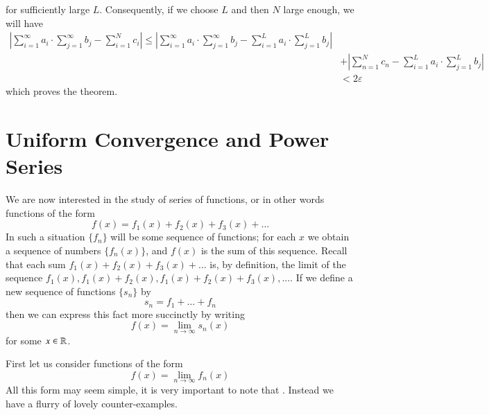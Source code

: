 \documentclass[12pt]{report}
\begin{document}
\begin{proof*}{}{}
    for sufficiently large $L$. Consequently, if we choose $L$ and then $N$ large enough, we will have \begin{align*}
        \left|\sum\limits_{i=1}^{\infty}a_i\cdot \sum\limits_{j=1}^{\infty}b_j - \sum\limits_{i=1}^Nc_i\right| \leq \left|\sum\limits_{i=1}^{\infty}a_i\cdot \sum\limits_{j=1}^{\infty}b_j - \sum\limits_{i=1}^La_i\cdot \sum\limits_{j=1}^Lb_j\right| \\
        &+ \left|\sum\limits_{n=1}^Nc_n - \sum\limits_{i=1}^La_i\cdot \sum\limits_{j=1}^Lb_j\right| \\
        &< 2\varepsilon
    \end{align*}
    which proves the theorem.
\end{proof*}




\section{Uniform Convergence and Power Series}


\begin{rmk}{}{}
    We are now interested in the study of series of functions, or in other words functions of the form \begin{equation*}
        f(x) = f_1(x) + f_2(x) + f_3(x) + \hdots
    \end{equation*}
    In such a situation $\{f_n\}$ will be some sequence of functions; for each $x$ we obtain a sequence of numbers $\{f_n(x)\}$, and $f(x)$ is the sum of this sequence. Recall that each sum $f_1(x)+f_2(x)+f_3(x) + \hdots$ is, by definition, the limit of the sequence $f_1(x),f_1(x)+f_2(x),f_1(x)+f_2(x)+f_3(x),...$. If we define a new sequence of functions $\{s_n\}$ by \begin{equation*}
        s_n = f_1 + \hdots + f_n
    \end{equation*}
    then we can express this fact more succinctly by writing \begin{equation*}
        f(x) = \lim\limits_{n\rightarrow \infty}s_n(x)
    \end{equation*}
    for some $x \in \mathbb R$.
\end{rmk}


\begin{rmk}{}{}
    First let us consider functions of the form \begin{equation*}
        f(x) = \lim\limits_{n\rightarrow\infty}f_n(x)
    \end{equation*}
    All this form may seem simple, it is very important to note that . Instead we have a flurry of lovely counter-examples.
\end{rmk}
\end{document}
